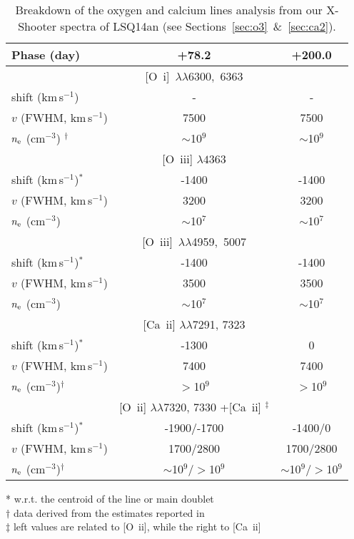 \documentclass[useAMS,usenatbib]{mn2e}
\def\kms{km\,s$^{-1}$}
\def\an{LSQ14an}
\def\oiii{[O~{\sc iii}]}
\begin{document}
\begin{table}
\caption{Breakdown of the oxygen and calcium lines analysis from our X-Shooter spectra of \an\/ (see Sections~\ref{sec:o3}~\&~\ref{sec:ca2}).}
\begin{center}
\begin{tabular}{lcc}
\hline
Phase (day) & +78.2 & +200.0 \\
\hline
& [O~{\sc i}]~$\lambda\lambda$6300,~6363 & \\
shift (\kms) & - & - \\
$v$ (FWHM, \kms) & 7500 & 7500\\
$n_{\rm e}$ (cm$^{-3}$) $^{\dagger}$ & $\sim$10$^9$& $\sim$10$^9$ \\
\hline
 & \oiii\/ $\lambda4363$ &\\
shift (\kms)$^*$ & -1400 & -1400 \\
$v$ (FWHM, \kms) & 3200 & 3200\\
$n_{\rm e}$ (cm$^{-3}$)  & $\sim$10$^7$& $\sim$10$^7$ \\
\hline
& \oiii\/~$\lambda\lambda$4959,~5007 & \\
shift (\kms)$^*$ & -1400  & -1400 \\
$v$ (FWHM, \kms) & 3500 & 3500 \\
$n_{\rm e}$ (cm$^{-3}$)  & $\sim$10$^7$& $\sim$10$^7$ \\
\hline
& [Ca~{\sc ii}] $\lambda\lambda$7291, 7323& \\
shift (\kms)$^*$ & -1300& 0 \\
$v$ (FWHM, \kms) & 7400 & 7400 \\
$n_{\rm e}$ (cm$^{-3}$)$^{\dagger}$& $>$10$^9$ & $>$10$^9$ \\    
\hline
& [O~{\sc ii}] $\lambda\lambda$7320, 7330 +[Ca~{\sc ii}] $^{\ddagger}$& \\
shift (\kms)$^*$ & -1900/-1700& -1400/0 \\
$v$ (FWHM, \kms) & 1700/2800& 1700/2800\\
$n_{\rm e}$ (cm$^{-3}$)$^{\dagger}$& $\sim$10$^9$/$>$10$^9$ & $\sim$10$^9$/$>$10$^9$\\                                                                                                                                
\hline
\end{tabular}
\end{center}
* w.r.t. the centroid of the line or main doublet\\
$\dagger$ data derived from the estimates reported in \citet{je16}\\
$\ddagger$ left values are related to [O~{\sc ii}], while the right to [Ca~{\sc ii}] 
\label{table:lines}
\end{table}%
\end{document}

